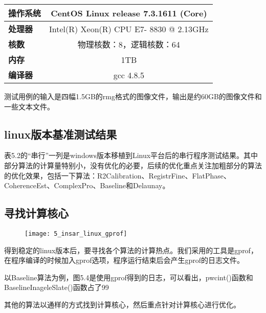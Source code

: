 \begin{table}[!htbp]
    \label{tab:5_insar_test_env}
    \centering
    \footnotesize
    \setlength{\tabcolsep}{4pt}
    \renewcommand{\arraystretch}{1.2} 
    \begin{tabular}{|>{\bfseries}l|c|}
        \hline
        操作系统 & CentOS Linux release 7.3.1611 (Core) \\ \hline
        处理器 & Intel(R) Xeon(R) CPU E7- 8830  @ 2.13GHz \\ \hline
        核数 & 物理核数：8，逻辑核数：64 \\ \hline
        内存 & 1TB \\ \hline
        编译器 & gcc 4.8.5 \\ \hline
    \end{tabular}
\end{table}

测试用例的输入是四幅1.5GB的rmg格式的图像文件，输出是约60GB的图像文件和一些文本文件。

\subsection{linux版本基准测试结果}

表5.2的“串行”一列是windows版本移植到Linux平台后的串行程序测试结果。其中部分算法的计算量特别小，没有优化的必要，后续的优化重点关注加粗部分的算法的优化效果，包括一下算法：R2Calibration、RegistrFine、FlatPhase、CoherenceEst、ComplexPro、Baseline和Delaunay。

\subsection{寻找计算核心}

\begin{figure}[!htbp]
    \centering
    \texttt{[image: 5\_insar\_linux\_gprof]}
    \label{fig:5_insar_linux_gprof}
\end{figure}

得到稳定的linux版本后，要寻找各个算法的计算热点。我们采用的工具是gprof，在程序编译的时候加入gprof选项，程序运行结束后会产生gprof的日志文件。

以Baseline算法为例，图5.4是使用gprof得到的日志，可以看出，pwcint()函数和BaselineInageleSlate()函数占了99%

其他的算法以通样的方式找到计算核心，然后重点针对计算核心进行优化。

